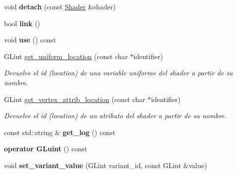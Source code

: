 \begin{DoxyCompactItemize}
\mbox{\label{classexample_1_1_shader___program_a83c1ac06873858589f454c5dfaa7b00c}} 
void {\bfseries detach} (const \mbox{\hyperlink{classexample_1_1_shader}{Shader}} \&shader)
\item 
\mbox{\label{classexample_1_1_shader___program_a6cf9a8d19d6c43210aaf5a51c036d214}} 
bool {\bfseries link} ()
\item 
\mbox{\label{classexample_1_1_shader___program_a70c29ba798a57a71ca2b74463f5ffe19}} 
void {\bfseries use} () const
\item 
G\+Lint \mbox{\hyperlink{classexample_1_1_shader___program_afa8e232ca74aa2ed94afaa7a14842464}{get\+\_\+uniform\+\_\+location}} (const char $\ast$identifier)
\begin{DoxyCompactList}\small\item\em Devuelve el id (location) de una variable uniforme del shader a partir de su nombre. \end{DoxyCompactList}\item 
G\+Lint \mbox{\hyperlink{classexample_1_1_shader___program_a456f2b6cee0125a6f02816b02d6ed702}{get\+\_\+vertex\+\_\+attrib\+\_\+location}} (const char $\ast$identifier)
\begin{DoxyCompactList}\small\item\em Devuelve el id (location) de un atributo del shader a partir de su nombre. \end{DoxyCompactList}\item 
\mbox{\label{classexample_1_1_shader___program_a496fcf1c81fb5812026d3ffa5d1bbe43}} 
const std\+::string \& {\bfseries get\+\_\+log} () const
\item 
\mbox{\label{classexample_1_1_shader___program_a0c9b4a8eca4fa15682d92c29801d55f1}} 
{\bfseries operator G\+Luint} () const
\item 
\mbox{\label{classexample_1_1_shader___program_a80db53308908d1f44931ca6f09d8cd2b}} 
void {\bfseries set\+\_\+variant\+\_\+value} (G\+Lint variant\+\_\+id, const G\+Lint \&value)
\item 
\mbox{\label{classexample_1_1_shader___program_a41518b1dc93c17beaaed95a800babbc3}} 

\end{DoxyCompactItemize}
